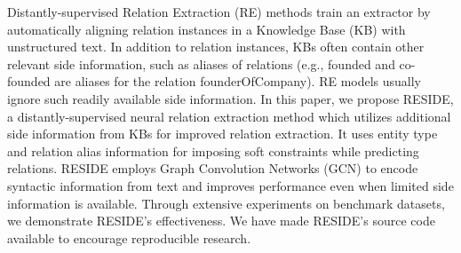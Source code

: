 Distantly-supervised Relation Extraction (RE) methods train an extractor by automatically aligning relation instances in a Knowledge Base (KB) with unstructured text. In addition to relation instances, KBs often contain other relevant side information, such as aliases of relations (e.g., founded and co-founded are aliases for the relation founderOfCompany). RE models usually ignore such readily available side information. In this paper, we propose RESIDE, a distantly-supervised neural relation extraction method which utilizes additional side information from KBs for improved relation extraction. It uses entity type and relation alias information for imposing soft constraints while predicting relations. RESIDE employs Graph Convolution Networks (GCN) to encode syntactic information from text and improves performance even when limited side information is available. Through extensive experiments on benchmark datasets, we demonstrate RESIDE's effectiveness. We have made RESIDE's source code available to encourage reproducible research.
